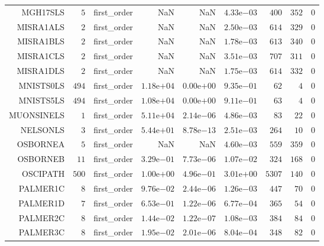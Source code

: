 \begin{longtable}{rrrrrrrrr}
MGH17SLS & \(     5\) & first\_order &       NaN &       NaN & \( 4.33\)e\(-03\) & \(   400\) & \(   352\) & \(     0\) \\
MISRA1ALS & \(     2\) & first\_order &       NaN &       NaN & \( 2.50\)e\(-03\) & \(   614\) & \(   329\) & \(     0\) \\
MISRA1BLS & \(     2\) & first\_order &       NaN &       NaN & \( 1.78\)e\(-03\) & \(   613\) & \(   340\) & \(     0\) \\
MISRA1CLS & \(     2\) & first\_order &       NaN &       NaN & \( 3.51\)e\(-03\) & \(   707\) & \(   311\) & \(     0\) \\
MISRA1DLS & \(     2\) & first\_order &       NaN &       NaN & \( 1.75\)e\(-03\) & \(   614\) & \(   332\) & \(     0\) \\
MNISTS0LS & \(   494\) & first\_order & \( 1.18\)e\(+04\) & \( 0.00\)e\(+00\) & \( 9.35\)e\(-01\) & \(    62\) & \(     4\) & \(     0\) \\
MNISTS5LS & \(   494\) & first\_order & \( 1.08\)e\(+04\) & \( 0.00\)e\(+00\) & \( 9.11\)e\(-01\) & \(    63\) & \(     4\) & \(     0\) \\
MUONSINELS & \(     1\) & first\_order & \( 5.11\)e\(+04\) & \( 2.14\)e\(-06\) & \( 4.86\)e\(-03\) & \(    83\) & \(    22\) & \(     0\) \\
NELSONLS & \(     3\) & first\_order & \( 5.44\)e\(+01\) & \( 8.78\)e\(-13\) & \( 2.51\)e\(-03\) & \(   264\) & \(    10\) & \(     0\) \\
OSBORNEA & \(     5\) & first\_order &       NaN &       NaN & \( 4.60\)e\(-03\) & \(   559\) & \(   359\) & \(     0\) \\
OSBORNEB & \(    11\) & first\_order & \( 3.29\)e\(-01\) & \( 7.73\)e\(-06\) & \( 1.07\)e\(-02\) & \(   324\) & \(   168\) & \(     0\) \\
OSCIPATH & \(   500\) & first\_order & \( 1.00\)e\(+00\) & \( 4.96\)e\(-01\) & \( 3.01\)e\(+00\) & \(  5307\) & \(   140\) & \(     0\) \\
PALMER1C & \(     8\) & first\_order & \( 9.76\)e\(-02\) & \( 2.44\)e\(-06\) & \( 1.26\)e\(-03\) & \(   447\) & \(    70\) & \(     0\) \\
PALMER1D & \(     7\) & first\_order & \( 6.53\)e\(-01\) & \( 1.22\)e\(-06\) & \( 6.77\)e\(-04\) & \(   365\) & \(    54\) & \(     0\) \\
PALMER2C & \(     8\) & first\_order & \( 1.44\)e\(-02\) & \( 1.22\)e\(-07\) & \( 1.08\)e\(-03\) & \(   384\) & \(    84\) & \(     0\) \\
PALMER3C & \(     8\) & first\_order & \( 1.95\)e\(-02\) & \( 2.01\)e\(-06\) & \( 8.04\)e\(-04\) & \(   348\) & \(    82\) & \(     0\) \\

\end{longtable}
